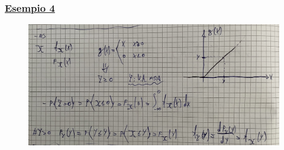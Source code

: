 \documentclass{article}
\begin{document}
\subsubsection{\underline{Esempio 4}}
\begin{figure}[ht]
\centering
\includegraphics[scale=0.13]{ese/21.jpeg}
\end{figure}
\end{document}
